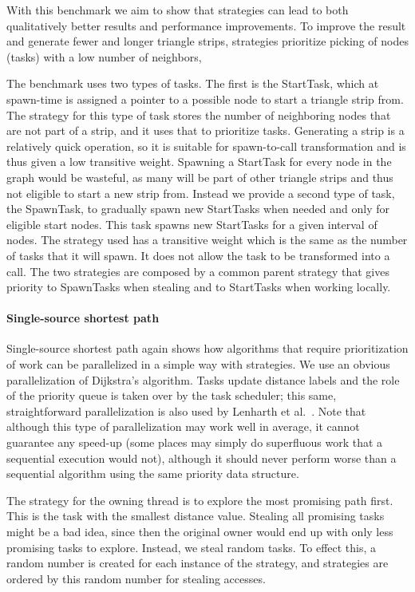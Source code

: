 \documentclass[a4paper,11pt]{article}
\begin{document}
With this benchmark we aim to show that strategies can lead to both
qualitatively better results and performance improvements.  To improve
the result and generate fewer and longer triangle strips, strategies
prioritize picking of nodes (tasks) with a low number of neighbors,

The benchmark uses two types of tasks. The first is the StartTask,
which at spawn-time is assigned a pointer to a possible node to start
a triangle strip from. The strategy for this type of task stores the
number of neighboring nodes that are not part of a strip, and it uses
that to prioritize tasks. Generating a strip is a relatively quick
operation, so it is suitable for spawn-to-call transformation and is
thus given a low transitive weight. Spawning a StartTask for every
node in the graph would be wasteful, as many will be part of other
triangle strips and thus not eligible to start a new strip
from. Instead we provide a second type of task, the SpawnTask, to
gradually spawn new StartTasks when needed and only for eligible start
nodes. This task spawns new StartTasks for a given interval of
nodes. The strategy used has a transitive weight which is the same as
the number of tasks that it will spawn. It does not allow the task to
be transformed into a call.  The two strategies are composed by a
common parent strategy that gives priority to SpawnTasks when stealing
and to StartTasks when working locally.

\paragraph{Single-source shortest path}
\label{sec:sssp}

Single-source shortest path again shows how algorithms that require
prioritization of work can be parallelized in a simple way with
strategies. We use an obvious parallelization of Dijkstra's
algorithm. Tasks update distance labels and the role of the priority
queue is taken over by the task scheduler; this same, straightforward
parallelization is also used by Lenharth et
al.~\cite{pingali2011}. Note that although this type of
parallelization may work well in average, it cannot guarantee any
speed-up (some places may simply do superfluous work that a sequential
execution would not), although it should never perform worse than a
sequential algorithm using the same priority data structure.

The strategy for the owning thread is to explore
the most promising path first. This is the task with the smallest
distance value. Stealing all promising tasks
might be a bad idea, since then the original owner would end up with
only less promising tasks to explore.
Instead, we steal random tasks. To effect this, a random number is
created for each instance of the strategy, and strategies are ordered
by this random number for stealing accesses.
\end{document}
